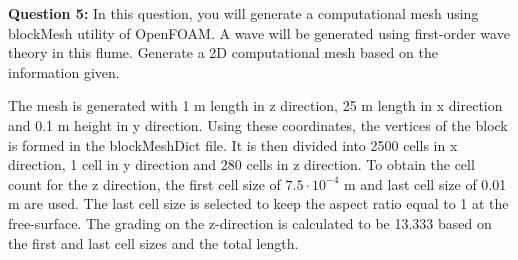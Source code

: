 \documentclass[a4paper]{article}
\begin{document}
\textbf{Question 5:} In this question, you will generate a computational mesh using blockMesh utility of OpenFOAM. A wave will be generated using first-order wave theory in this flume. Generate a 2D computational mesh based on the information given.
\vspace{0.3cm}

The mesh is generated with 1 m length in z direction, 25 m length in x direction and 0.1 m height in y direction. Using these coordinates, the vertices of the block is formed in the blockMeshDict file. It is then divided into 2500 cells in x direction, 1 cell in y direction and 280 cells in z direction. To obtain the cell count for the z direction, the first cell size of $7.5 \cdot 10^{-4}$ m and last cell size of 0.01 m are used. The last cell size is selected to keep the aspect ratio equal to 1 at the free-surface. The grading on the z-direction is calculated to be 13.333 based on the first and last cell sizes and the total length.
\end{document}
